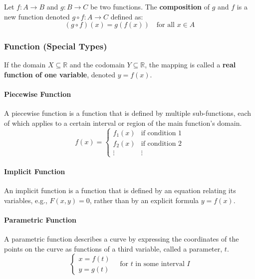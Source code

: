 \begin{definition}
Let $f: A \to B$ and $g: B \to C$ be two functions. The \textbf{composition} of $g$ and $f$ is a new function denoted $g \circ f: A \to C$ defined as:
$$ (g \circ f)(x) = g(f(x)) \quad \text{for all } x \in A $$
\end{definition}

\subsubsection{Function (Special Types)}
\begin{definition}
If the domain $X \subseteq \mathbb{R}$ and the codomain $Y \subseteq \mathbb{R}$, the mapping is called a \textbf{real function of one variable}, denoted $y = f(x)$.
\end{definition}

\paragraph{Piecewise Function}
A piecewise function is a function that is defined by multiple sub-functions, each of which applies to a certain interval or region of the main function's domain.
$$ f(x) = \begin{cases}
    f_1(x) & \text{if condition 1} \\
    f_2(x) & \text{if condition 2} \\
    \vdots & \vdots
    \end{cases} $$
    
\paragraph{Implicit Function}
An implicit function is a function that is defined by an equation relating its variables, e.g., $F(x,y) = 0$, rather than by an explicit formula $y = f(x)$.

\paragraph{Parametric Function}
A parametric function describes a curve by expressing the coordinates of the points on the curve as functions of a third variable, called a parameter, $t$.
$$ \begin{cases}
    x = f(t) \\
    y = g(t)
    \end{cases} \quad \text{for } t \text{ in some interval } I $$
    
